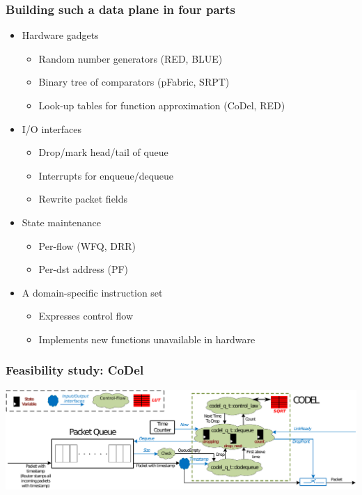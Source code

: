 \begin{Large}
\begin{frame}[plain]
\frametitle{Building such a data plane in four parts}
\begin{itemize}
\item<1-> Hardware gadgets
      \begin{itemize}
      \item Random number generators (RED, BLUE)
      \item Binary tree of comparators (pFabric, SRPT)
      \item Look-up tables for function approximation (CoDel, RED)
      \end{itemize}

\item<2-> I/O interfaces
      \begin{itemize}
      \item Drop/mark head/tail of queue
      \item Interrupts for enqueue/dequeue
      \item Rewrite packet fields
      \end{itemize}

\item<3-> State maintenance
      \begin{itemize}
      \item Per-flow (WFQ, DRR)
      \item Per-dst address (PF)
      \end{itemize}

\item<4-> A domain-specific instruction set
      \begin{itemize}
      \item Expresses control flow
      \item Implements new functions unavailable in hardware
      \end{itemize}
\end{itemize}
\end{frame}

\begin{frame}[plain]
\frametitle{Feasibility study: CoDel}
\begin{center}
\includegraphics[width=\columnwidth]{codel.pdf}
\end{center}
\end{frame}


\end{Large}
